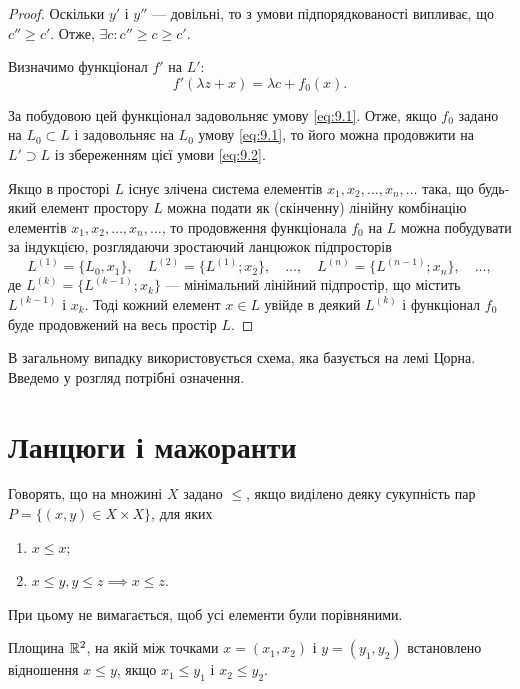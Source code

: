 \begin{proof}
Оскільки $y'$ і $y''$ --- довільні, то з умови підпорядкованості
випливає, що $c'' \ge c'$. Отже, $\exists c: c'' \ge c \ge c'$.

Визначимо функціонал $f'$ на $L'$:
\begin{equation*}
    f'(\lambda z + x) = \lambda c + f_0(x).
\end{equation*}

За побудовою цей функціонал задовольняє умову \eqref{eq:9.1}. Отже,
якщо $f_0$ задано на $L_0 \subset L$ і задовольняє на $L_0$ умову \eqref{eq:9.1}, то
його можна продовжити на $L' \supset L$ із збереженням цієї умови \eqref{eq:9.2}.

Якщо в просторі $L$ існує злічена система елементів
$x_1, x_2, \dots, x_n, \dots$ така, що будь-який елемент простору $L$ можна
подати як (скінченну) лінійну комбінацію елементів $x_1, x_2, \dots, x_n, \dots$, то
продовження функціонала $f_0$ на $L$ можна побудувати за
індукцією, розглядаючи зростаючий ланцюжок підпросторів
\begin{equation*}
    L^{(1)} = \{L_0, x_1\}, \quad L^{(2)} = \{L^{(1)}; x_2\}, \quad \dots, \quad L^{(n)} = \{L^{(n - 1)}; x_n\}, \quad \dots,
\end{equation*}
де $L^{(k)} = \{L^{(k - 1)}; x_k\}$ --- мінімальний лінійний підпростір, що
містить $L^{(k - 1)}$ і $x_k$. Тоді кожний елемент $x \in L$ увійде в
деякий $L^{(k)}$ і функціонал $f_0$ буде продовжений на весь
простір $L$. 
\end{proof}

В загальному випадку використовується схема,
яка базується на лемі Цорна. Введемо у розгляд потрібні
означення.

\section{Ланцюги і мажоранти}

\begin{definition}
Говорять, що на множині $X$ задано  $\le$, якщо виділено деяку сукупність пар
$P = \{(x, y) \in X \times X\}$, для яких
\begin{enumerate}
    \item $x \le x$;
    \item $x \le y, y \le z \implies x \le z$.
\end{enumerate}
При цьому не вимагається, щоб усі елементи були порівняними.
\end{definition}

\begin{example}
Площина $\mathbb{R}^2$, на якій між точками
$x = (x_1, x_2)$ і $y = (y_1, y_2)$
встановлено відношення $x \le y$, якщо
$x_1 \le y_1$ і $x_2 \le y_2$.
\end{example}

